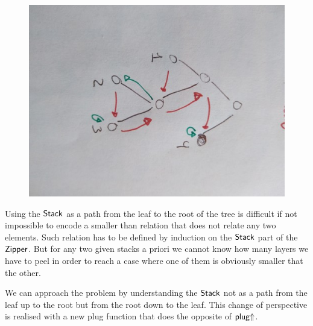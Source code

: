 \documentclass[sigplan,10pt,review]{acmart}
\newcommand{\AD}{\AgdaDatatype}
\newcommand{\AF}{\AgdaFunction}
\begin{document}
\begin{figure}[h]
  \includegraphics[scale=0.25, angle=90]{figure3}
\end{figure}

Using the \ensuremath{\AD{Stack}} as a path from the leaf to the root of the tree is difficult
if not impossible to encode a smaller than relation that does not relate any two
elements. Such relation has to be defined by induction on the \ensuremath{\AD{Stack}} part of the
\ensuremath{\AD{Zipper}}. But for any two given stacks a priori we cannot know how many layers
we have to peel in order to reach a case where one of them is obviously smaller
that the other.

We can approach the problem by understanding the \ensuremath{\AD{Stack}} not as a path from the
leaf up to the root but from the root down to the leaf. This change of
perspective is realised with a new plug function that does the opposite of
\ensuremath{\AF{plug\ensuremath{\Uparrow}}}.
\end{document}
